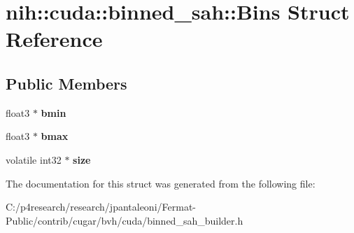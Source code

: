 \hypertarget{structnih_1_1cuda_1_1binned__sah_1_1_bins}{}\section{nih\+:\+:cuda\+:\+:binned\+\_\+sah\+:\+:Bins Struct Reference}
\label{structnih_1_1cuda_1_1binned__sah_1_1_bins}
\subsection*{Public Members}
\begin{DoxyCompactItemize}
\item 
\mbox{\label{structnih_1_1cuda_1_1binned__sah_1_1_bins_af7889584471558c956563c5730f164c3}} 
float3 $\ast$ {\bfseries bmin}
\item 
\mbox{\label{structnih_1_1cuda_1_1binned__sah_1_1_bins_a5c137083661b5ccbbe2d9be2a2ebeec1}} 
float3 $\ast$ {\bfseries bmax}
\item 
\mbox{\label{structnih_1_1cuda_1_1binned__sah_1_1_bins_a3bd6e9ce57e1b2020a1a342a4a49112b}} 
volatile int32 $\ast$ {\bfseries size}
\end{DoxyCompactItemize}


The documentation for this struct was generated from the following file\+:\begin{DoxyCompactItemize}
\item 
C\+:/p4research/research/jpantaleoni/\+Fermat-\/\+Public/contrib/cugar/bvh/cuda/binned\+\_\+sah\+\_\+builder.\+h\end{DoxyCompactItemize}
